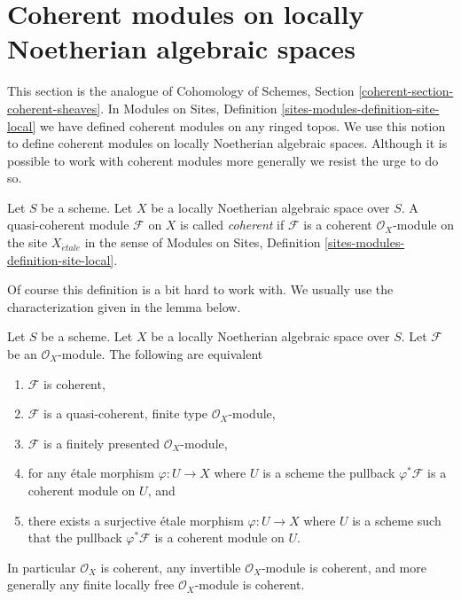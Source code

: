 \section{Coherent modules on locally Noetherian algebraic spaces}
\label{section-coherent}

\noindent
This section is the analogue of
Cohomology of Schemes, Section \ref{coherent-section-coherent-sheaves}.
In Modules on Sites, Definition \ref{sites-modules-definition-site-local}
we have defined coherent modules on any ringed topos. We use this notion
to define coherent modules on locally Noetherian algebraic spaces.
Although it is possible to work with coherent modules more generally
we resist the urge to do so.

\begin{definition}
\label{definition-coherent}
Let $S$ be a scheme. Let $X$ be a locally Noetherian algebraic space over $S$.
A quasi-coherent module $\mathcal{F}$ on $X$ is called {\it coherent}
if $\mathcal{F}$ is a coherent $\mathcal{O}_X$-module on the site
$X_{\acute{e}tale}$ in the sense of
Modules on Sites, Definition \ref{sites-modules-definition-site-local}.
\end{definition}

\noindent
Of course this definition is a bit hard to work with. We usually use
the characterization given in the lemma below.

\begin{lemma}
\label{lemma-coherent-Noetherian}
Let $S$ be a scheme.
Let $X$ be a locally Noetherian algebraic space over $S$.
Let $\mathcal{F}$ be an $\mathcal{O}_X$-module.
The following are equivalent
\begin{enumerate}
\item $\mathcal{F}$ is coherent,
\item $\mathcal{F}$ is a quasi-coherent, finite type $\mathcal{O}_X$-module,
\item $\mathcal{F}$ is a finitely presented $\mathcal{O}_X$-module,
\item for any \'etale morphism $\varphi : U \to X$ where $U$ is a scheme
the pullback $\varphi^*\mathcal{F}$ is a coherent module on $U$, and
\item there exists a surjective \'etale morphism $\varphi : U \to X$
where $U$ is a scheme such that the pullback $\varphi^*\mathcal{F}$ is
a coherent module on $U$.
\end{enumerate}
In particular $\mathcal{O}_X$ is coherent, any invertible
$\mathcal{O}_X$-module is coherent, and more generally any
finite locally free $\mathcal{O}_X$-module is coherent.
\end{lemma}

